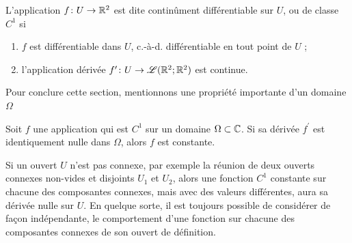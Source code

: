 \begin{fdefn}
L'application $f \colon U \to \mathbb R^2$ est dite continûment différentiable sur $U$, ou de classe $C^1$ si
\begin{enumerate}
\item $f$ est différentiable dans $U$, c.-à-d. différentiable en tout point de $U$ ;
\item l'application dérivée $f^\prime \colon U \to \mathcal{L}(\mathbb R^2 ; \mathbb R^2)$ est continue.
\end{enumerate}  
\end{fdefn}

Pour conclure cette section, mentionnons une propriété importante d'un domaine $\Omega$
\begin{fprop} Soit $f$ une application qui est $C^1$ sur un domaine $\Omega \subset \mathbb{C}$. Si sa dérivée $f^\prime$ est identiquement nulle dans $\Omega$, alors $f$ est constante.
\end{fprop}

Si un ouvert $U$ n'est pas connexe, par exemple la réunion de deux ouverts connexes non-vides et disjoints $U_1$ et $U_2$, alors une fonction $C^1$ constante sur chacune des composantes connexes, mais avec des valeurs différentes, aura sa dérivée nulle sur $U$. En quelque sorte, il est toujours possible de considérer de façon indépendante, le comportement d'une fonction sur chacune des composantes connexes de son ouvert de définition. 



